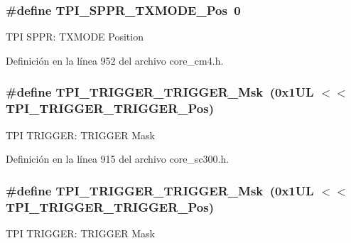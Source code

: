 \subsubsection[{\texorpdfstring{T\+P\+I\+\_\+\+S\+P\+P\+R\+\_\+\+T\+X\+M\+O\+D\+E\+\_\+\+Pos}{TPI_SPPR_TXMODE_Pos}}]{\setlength{\rightskip}{0pt plus 5cm}\#define T\+P\+I\+\_\+\+S\+P\+P\+R\+\_\+\+T\+X\+M\+O\+D\+E\+\_\+\+Pos~0}\hypertarget{group___c_m_s_i_s___t_p_i_ga0f302797b94bb2da24052082ab630858}{}\label{group___c_m_s_i_s___t_p_i_ga0f302797b94bb2da24052082ab630858}
T\+PI S\+P\+PR\+: T\+X\+M\+O\+DE Position 

Definición en la línea 952 del archivo core\+\_\+cm4.\+h.

\subsubsection[{\texorpdfstring{T\+P\+I\+\_\+\+T\+R\+I\+G\+G\+E\+R\+\_\+\+T\+R\+I\+G\+G\+E\+R\+\_\+\+Msk}{TPI_TRIGGER_TRIGGER_Msk}}]{\setlength{\rightskip}{0pt plus 5cm}\#define T\+P\+I\+\_\+\+T\+R\+I\+G\+G\+E\+R\+\_\+\+T\+R\+I\+G\+G\+E\+R\+\_\+\+Msk~(0x1\+U\+L $<$$<$ T\+P\+I\+\_\+\+T\+R\+I\+G\+G\+E\+R\+\_\+\+T\+R\+I\+G\+G\+E\+R\+\_\+\+Pos)}\hypertarget{group___c_m_s_i_s___t_p_i_ga814227af2b2665a0687bb49345e21110}{}\label{group___c_m_s_i_s___t_p_i_ga814227af2b2665a0687bb49345e21110}
T\+PI T\+R\+I\+G\+G\+ER\+: T\+R\+I\+G\+G\+ER Mask 

Definición en la línea 915 del archivo core\+\_\+sc300.\+h.

\subsubsection[{\texorpdfstring{T\+P\+I\+\_\+\+T\+R\+I\+G\+G\+E\+R\+\_\+\+T\+R\+I\+G\+G\+E\+R\+\_\+\+Msk}{TPI_TRIGGER_TRIGGER_Msk}}]{\setlength{\rightskip}{0pt plus 5cm}\#define T\+P\+I\+\_\+\+T\+R\+I\+G\+G\+E\+R\+\_\+\+T\+R\+I\+G\+G\+E\+R\+\_\+\+Msk~(0x1\+U\+L $<$$<$ T\+P\+I\+\_\+\+T\+R\+I\+G\+G\+E\+R\+\_\+\+T\+R\+I\+G\+G\+E\+R\+\_\+\+Pos)}\hypertarget{group___c_m_s_i_s___t_p_i_ga814227af2b2665a0687bb49345e21110}{}\label{group___c_m_s_i_s___t_p_i_ga814227af2b2665a0687bb49345e21110}
T\+PI T\+R\+I\+G\+G\+ER\+: T\+R\+I\+G\+G\+ER Mask 

